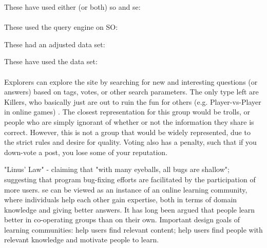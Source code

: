 These have used either (or both) \gls{so} and \gls{se}: \\
\cite{Ahmed2015, Hanrahan2012, Anderson2012, Nasehi2012, Posnett2012, Yang2014, Sewak2010, Movshovitz-Attias2013, Treude2011, Lezina2013, Stanley2013, Short2014} \\

These used the query engine on SO: \\
\cite{Nasehi2012, Treude2011}

These had an adjusted data set: \\
\cite{Lezina2013}

These have used the data set: \\
\cite{Ahmed2015, Hanrahan2012, Anderson2012, Posnett2012, Stanley2013, Yang2014, Short2014, Movshovitz-Attias2013}
~\\

Explorers can explore the site by searching for new and interesting questions (or answers) based on tags, votes, or other search parameters. 
The only type left are Killers, who basically just are out to ruin the fun for others (e.g. Player-vs-Player in online games) \cite[p.~3]{Maan2013}. 
The closest representation for this group would be trolls, or people who are simply ignorant of whether or not the information they share is correct.
However, this is not a group that would be widely represented, due to the strict rules and desire for quality. 
Voting also has a penalty, such that if you down-vote a post, you lose some of your reputation.


"Linus' Law" - claiming that "with many eyeballs, all bugs are shallow"; suggesting that program bug-fixing efforts are facilitated by the participation of more users.
\gls{se} can be viewed as an instance of an online learning community, where individuals help each other gain expertise, both in terms of domain knowledge and giving better answers.
It has long been argued that people learn better in co-operating groups than on their own. 
Important design goals of learning communities: help users find relevant content; help users find people with relevant knowledge and motivate people to learn.
\cite{Posnett2012}



